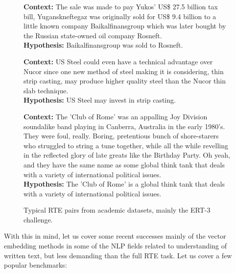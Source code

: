 \documentclass[11pt,a4paper]{article}
\begin{document}
\begin{figure}
	\footnotesize
	\textbf{Context:} The sale was made to pay Yukos' US\$ 27.5 billion tax bill, Yuganskneftegaz was originally sold for US\$ 9.4 billion to a little known company Baikalfinansgroup which was later bought by the Russian state-owned oil company Rosneft. \\
	\textbf{Hypothesis:} Baikalfinansgroup was sold to Rosneft.

	\vspace{2ex}

	\textbf{Context:} US Steel could even have a technical advantage over Nucor since one new method of steel making it is considering, thin strip casting, may produce higher quality steel than the Nucor thin slab technique. \\
	\textbf{Hypothesis:} US Steel may invest in strip casting.

	\vspace{2ex}

	\textbf{Context:} The 'Club of Rome' was an appalling Joy Division soundalike band playing in Canberra, Australia in the early 1980's. They were foul, really. Boring, pretentious bunch of shore-starers who struggled to string a tune together, while all the while revelling in the reflected glory of late greats like the Birthday Party. Oh yeah, and they have the same name as some global think tank that deals with a variety of international political issues. \\
	\textbf{Hypothesis:} The 'Club of Rome' is a global think tank that deals with a variety of international political issues.

	\caption{Typical RTE pairs from academic datasets, mainly the ERT-3 challenge.}
	\label{fig:rte3}
\end{figure}

With this in mind, let us cover some recent successes mainly of
the vector embedding methods in some of the NLP fields related
to understanding of written text, but less demanding than the
full RTE task.  Let us cover a few popular benchmarks:
\end{document}
